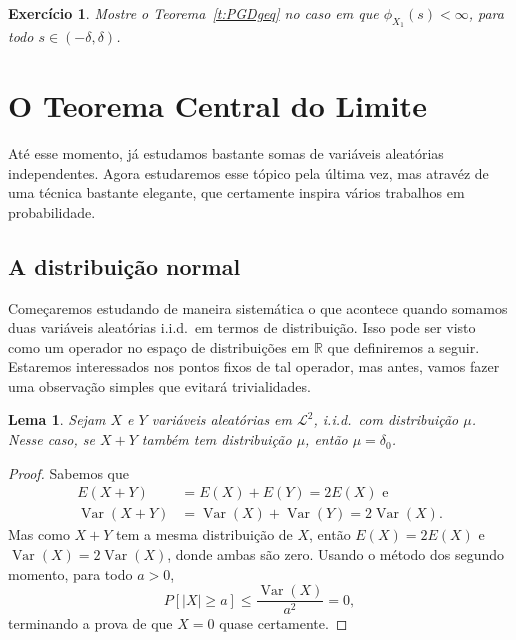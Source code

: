 \documentclass[reqno, final]{book}
\newcommand*\1{\mathds{1}}
\newtheorem{lemma}[theorem]{Lema}
\newtheorem{exercise}[example]{Exercício}
\DeclareMathOperator{\Var}{Var}
\def \iid{i.i.d.~}
\begin{document}
\begin{exercise}
  Mostre o Teorema~\ref{t:PGDgeq} no caso em que $\phi_{X_1}(s) < \infty$, para todo $s \in (-\delta, \delta)$.
\end{exercise}

\section{O Teorema Central do Limite}

Até esse momento, já estudamos bastante somas de variáveis aleatórias independentes.
Agora estudaremos esse tópico pela última vez, mas atravéz de uma técnica bastante elegante, que certamente inspira vários trabalhos em probabilidade.

\subsection{A distribuição normal}

Começaremos estudando de maneira sistemática o que acontece quando somamos duas variáveis aleatórias \iid em termos de distribuição.
Isso pode ser visto como um operador no espaço de distribuições em $\mathbb{R}$ que definiremos a seguir.
Estaremos interessados nos pontos fixos de tal operador, mas antes, vamos fazer uma observação simples que evitará trivialidades.

\begin{lemma}
  Sejam $X$ e $Y$ variáveis aleatórias em $\mathcal{L}^2$, \iid com distribuição $\mu$.
  Nesse caso, se $X + Y$ também tem distribuição $\mu$, então $\mu = \delta_0$.
\end{lemma}

\begin{proof}
  Sabemos que
  \begin{equation}
    \begin{split}
      E(X + Y) & = E(X) + E(Y) = 2 E(X) \text{ e}\\
      \Var(X + Y) & = \Var(X) + \Var(Y) = 2 \Var(X).
    \end{split}
  \end{equation}
  Mas como $X + Y$ tem a mesma distribuição de $X$, então $E(X) = 2 E(X)$ e $\Var(X) = 2 \Var(X)$, donde ambas são zero.
  Usando o método dos segundo momento, para todo $a > 0$,
  \begin{equation}
    P[|X| \geq a] \leq \frac{\Var(X)}{a^2} = 0,
  \end{equation}
  terminando a prova de que $X = 0$ quase certamente.
\end{proof}
\end{document}
